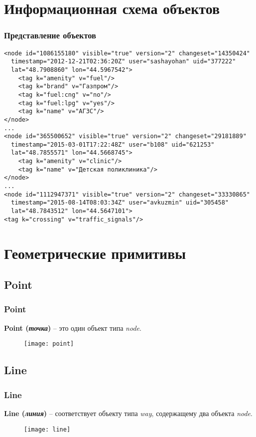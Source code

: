 \section{Информационная схема объектов}
\begin{frame}[fragile]
    \frametitle{Представление объектов}
    \begin{lstlisting}
<node id="1086155180" visible="true" version="2" changeset="14350424"
  timestamp="2012-12-21T02:36:20Z" user="sashayohan" uid="377222"
  lat="48.7908860" lon="44.5967542">
    <tag k="amenity" v="fuel"/>
    <tag k="brand" v="Газпром"/>
    <tag k="fuel:cng" v="no"/>
    <tag k="fuel:lpg" v="yes"/>
    <tag k="name" v="АГЗС"/>
</node>
...
<node id="365500652" visible="true" version="2" changeset="29181889"
  timestamp="2015-03-01T17:22:48Z" user="b108" uid="621253"
  lat="48.7855571" lon="44.5668745">
    <tag k="amenity" v="clinic"/>
    <tag k="name" v="Детская поликлиника"/>
</node>
...
<node id="1112947371" visible="true" version="2" changeset="33330865"
  timestamp="2015-08-14T08:03:34Z" user="avkuzmin" uid="305458"
  lat="48.7843512" lon="44.5647101">
<tag k="crossing" v="traffic_signals"/>
    \end{lstlisting}
\end{frame}

\section{Геометрические примитивы}
\subsection{Point}
\begin{frame}
    \frametitle{Point}
    \textbf{Point (\emph{точка})} -- это один объект типа \emph{node}.
    \begin{figure}[ht!]
        \center
        \texttt{[image: point]}
    \end{figure}
\end{frame}

\subsection{Line}
\begin{frame}
    \frametitle{Line}
    \textbf{Line (\emph{линия})} -- соответствует объекту типа \emph{way}, 
    содержащему два объекта \emph{node}.
    \begin{figure}[ht!]
        \center
        \texttt{[image: line]}
    \end{figure}
\end{frame}

